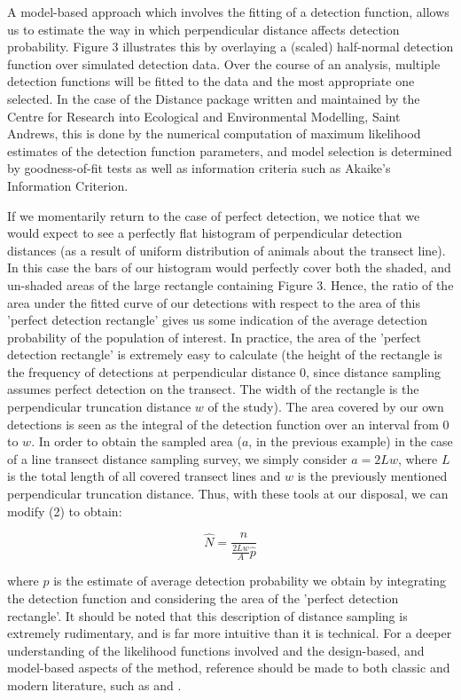 \documentclass[11pt]{article}
\begin{document}
\begin{multicols}{2}
A model-based approach which involves the fitting of a detection function, allows us to estimate the way in which perpendicular distance affects detection probability. Figure 3 illustrates this by overlaying a (scaled) half-normal detection function over simulated detection data. Over the course of an analysis, multiple detection functions will be fitted to the data and the most appropriate one selected. In the case of the Distance package written and maintained by the Centre for Research into Ecological and Environmental Modelling, Saint Andrews, this is done by the numerical computation of maximum likelihood estimates of the detection function parameters, and model selection is determined by goodness-of-fit tests as well as information criteria such as Akaike's Information Criterion.


If we momentarily return to the case of perfect detection, we notice that we would expect to see a perfectly flat histogram of perpendicular detection distances (as a result of uniform distribution of animals about the transect line). In this case the bars of our histogram would perfectly cover both the shaded, and un-shaded areas of the large rectangle containing Figure 3. Hence, the ratio of the area under the fitted curve of our detections with respect to the area of this 'perfect detection rectangle' gives us some indication of the average detection probability of the population of interest. In practice, the area of the 'perfect detection rectangle' is extremely easy to calculate (the height of the rectangle is the frequency of detections at perpendicular distance 0, since distance sampling assumes perfect detection on the transect. The width of the rectangle is the perpendicular truncation distance $w$ of the study). The area covered by our own detections is seen as the integral of the detection function over an interval from $0$ to $w$. In order to obtain the sampled area ($a$, in the previous example) in the case of a line transect distance sampling survey, we simply consider $a=2Lw$, where $L$ is the total length of all covered transect lines and $w$ is the previously mentioned perpendicular truncation distance. Thus, with these tools at our disposal, we can modify (2) to obtain:

\begin{equation}
\hat{N}=\frac{n}{\frac{2Lw}{A}\hat{p}}
\end{equation}


where $\hat{p}$ is the estimate of average detection probability we obtain by integrating the detection function and considering the area of the 'perfect detection rectangle'. It should be noted that this description of distance sampling is extremely rudimentary, and is far more intuitive than it is technical. For a deeper understanding of the likelihood functions involved and the design-based, and model-based aspects of the method, reference should be made to both classic and modern literature, such as \cite{EAB} and \cite{DS2015}.


\end{multicols}
\end{document}
